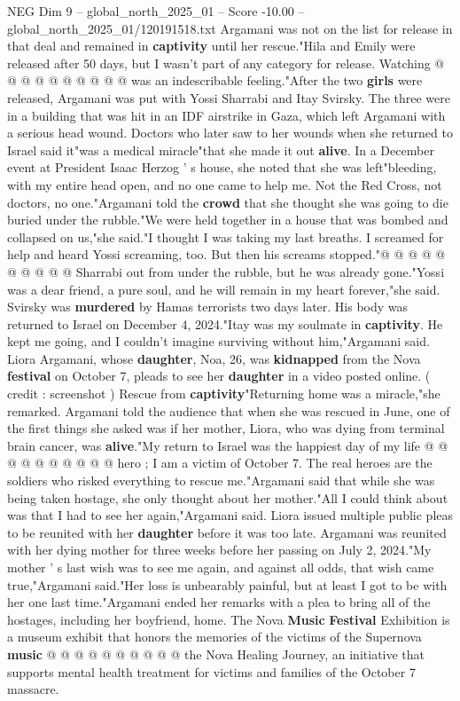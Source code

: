 \begin{textsample}{NEG Dim 9 – global\_north\_2025\_01 – Score -10.00 – global\_north\_2025\_01/120191518.txt}
Argamani was not on the list for release in that deal and remained in \textbf{captivity} until her rescue."Hila and Emily were released after 50 days, but I wasn't part of any category for release.
Watching @ @ @ @ @ @ @ @ @ @ was an indescribable feeling."After the two \textbf{girls} were released, Argamani was put with Yossi Sharrabi and Itay Svirsky.
The three were in a building that was hit in an IDF airstrike in Gaza, which left Argamani with a serious head wound.
Doctors who later saw to her wounds when she returned to Israel said it"was a medical miracle"that she made it out \textbf{alive}.
In a December event at President Isaac Herzog ' s house, she noted that she was left"bleeding, with my entire head open, and no one came to help me.
Not the Red Cross, not doctors, no one."Argamani told the \textbf{crowd} that she thought she was going to die buried under the rubble."We were held together in a house that was bombed and collapsed on us,"she said."I thought I was taking my last breaths.
I screamed for help and heard Yossi screaming, too.
But then his screams stopped."@ @ @ @ @ @ @ @ @ @ Sharrabi out from under the rubble, but he was already gone."Yossi was a dear friend, a pure soul, and he will remain in my heart forever,"she said.
Svirsky was \textbf{murdered} by Hamas terrorists two days later.
His body was returned to Israel on December 4, 2024."Itay was my soulmate in \textbf{captivity}.
He kept me going, and I couldn't imagine surviving without him,"Argamani said.
Liora Argamani, whose \textbf{daughter}, Noa, 26, was \textbf{kidnapped} from the Nova \textbf{festival} on October 7, pleads to see her \textbf{daughter} in a video posted online. ( credit : screenshot ) Rescue from \textbf{captivity}"Returning home was a miracle,"she remarked.
Argamani told the audience that when she was rescued in June, one of the first things she asked was if her mother, Liora, who was dying from terminal brain cancer, was \textbf{alive}."My return to Israel was the happiest day of my life @ @ @ @ @ @ @ @ @ @ hero ; I am a victim of October 7.
The real heroes are the soldiers who risked everything to rescue me."Argamani said that while she was being taken hostage, she only thought about her mother."All I could think about was that I had to see her again,"Argamani said.
Liora issued multiple public pleas to be reunited with her \textbf{daughter} before it was too late.
Argamani was reunited with her dying mother for three weeks before her passing on July 2, 2024."My mother ' s last wish was to see me again, and against all odds, that wish came true,"Argamani said."Her loss is unbearably painful, but at least I got to be with her one last time."Argamani ended her remarks with a plea to bring all of the hostages, including her boyfriend, home.
The Nova \textbf{Music} \textbf{Festival} Exhibition is a museum exhibit that honors the memories of the victims of the Supernova \textbf{music} @ @ @ @ @ @ @ @ @ @ the Nova Healing Journey, an initiative that supports mental health treatment for victims and families of the October 7 massacre.

\end{textsample}
